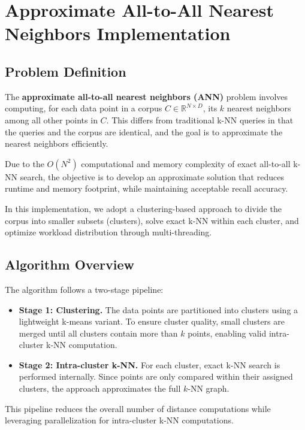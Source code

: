 \documentclass{article}
\begin{document}
\section{Approximate All-to-All Nearest Neighbors Implementation}

\subsection{Problem Definition}

The \textbf{approximate all-to-all nearest neighbors (ANN)} problem involves computing, for each data 
point in a corpus $C \in \mathbb{R}^{N \times D}$, its $k$ nearest neighbors among all other points 
in $C$. This differs from traditional k-NN queries in that the queries and the corpus are identical,
and the goal is to approximate the nearest neighbors efficiently. 

Due to the $O(N^2)$ computational and memory complexity of exact all-to-all k-NN search, the objective 
is to develop an approximate solution that reduces runtime and memory footprint, while maintaining 
acceptable recall accuracy. 

In this implementation, we adopt a clustering-based approach to divide the corpus into smaller subsets 
(clusters), solve exact k-NN within each cluster, and optimize workload distribution through multi-threading.

\subsection{Algorithm Overview}

The algorithm follows a two-stage pipeline:
\begin{itemize}
    \item \textbf{Stage 1: Clustering.} The data points are partitioned into clusters using a lightweight
    k-means variant. To ensure cluster quality, small clusters are merged until all clusters contain more 
    than $k$ points, enabling valid intra-cluster k-NN computation.
    \item \textbf{Stage 2: Intra-cluster k-NN.} For each cluster, exact k-NN search is performed internally.
    Since points are only compared within their assigned clusters, the approach approximates the full $k$-NN 
    graph.
\end{itemize}

This pipeline reduces the overall number of distance computations while leveraging parallelization for 
intra-cluster k-NN computations.
\end{document}
